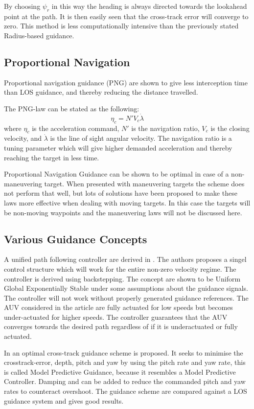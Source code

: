 		By choosing $\psi_r$ in this way the heading is always directed towards the lookahead point at
		the path. It is then easily seen that the cross-track error will converge to zero. This
		method is less computationally intensive than the previously stated Radius-based
		guidance. \cite{guidance_planar_path}
	
	\subsection{Proportional Navigation}
		Proportional navigation guidance (PNG) are shown to give less interception time than LOS guidance,
		and thereby reducing the distance travelled. \cite{GuidanceReview}
		
		The PNG-law can be stated as the following:
		\begin{equation}
			\eta_c = N' V_c \dot{\lambda}
		\end{equation}
		where $\eta_c$ is the acceleration command, $N'$ is the navigation ratio, $V_c$ is the closing
		velocity, and $\dot{\lambda}$ is the line of sight angular velocity. The navigation ratio is a
		tuning parameter which will give higher demanded acceleration and thereby reaching the target 
		in less	time.
		
		Proportional Navigation Guidance can be shown to be optimal in case of a non-maneuvering
		target. When presented with maneuvering targets the scheme does not perform that well, but lots of
		solutions have been proposed to make these laws more effective when dealing with moving
		targets. In this case the targets will be non-moving waypoints and the maneuvering laws
		will not be discussed here.

	\subsection{Various Guidance Concepts}
		A unified path following controller are derived in \cite{control-concept-AUV}. The 
		authors proposes a singel control structure which will work for the entire non-zero velocity regime.
		The controller is derived using backstepping. The concept are shown to be Uniform Global
		Exponentially Stable under some assumptions about the guidance signals. The controller will not
		work without properly generated guidance references. The AUV considered in the article are fully
		actuated for low
		speeds but becomes under-actuated for higher speeds. The controller guarantees that the AUV
		converges towards the desired path regardless of if it is underactuated or fully actuated.
		
		In \cite{optimal-cross-track} an optimal cross-track guidance scheme is proposed. It seeks to
		minimise the crosstrack-error, depth, pitch and yaw by using the pitch rate and yaw rate, this
		is called Model	Predictive Guidance, because it resembles a Model Predictive Controller. Damping
		and can be added to reduce the commanded
		pitch and yaw rates to counteract overshoot. The guidance scheme are compared against a LOS
		guidance system and gives good results.
	

